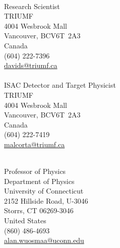 {\setlength{\parindent}{0in}

\begin{multicols}{2}

\\
Research Scientist\\
TRIUMF\\
4004 Wesbrook Mall\\
Vancouver, BC\hspace{6pt}V6T~2A3\\
Canada\\
(604) 222-7396\\
\href{mailto:davids@triumf.ca}{davids@triumf.ca}\\

\\
ISAC Detector and Target Physicist\\
TRIUMF\\
4004 Wesbrook Mall\\
Vancouver, BC\hspace{6pt}V6T~2A3\\
Canada\\
(604) 222-7419\\
\href{mailto:malcorta@triumf.ca}{malcorta@triumf.ca}\\
\columnbreak

\\
Professor of Physics\\
Department of Physics\\
University of Connecticut\\
2152 Hillside Road, U-3046\\
Storrs,  CT 06269-3046\\
United States\\
(860) 486-4693\\
\href{mailto:alan.wuosmaa@uconn.edu}{alan.wuosmaa@uconn.edu}\\




\end{multicols}}
